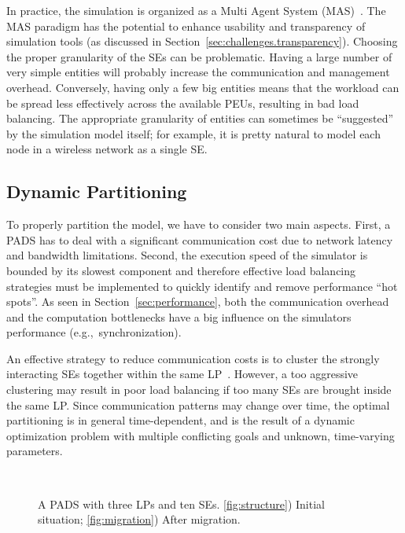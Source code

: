 \documentclass[1p]{elsarticle}
\begin{document}
In practice, the simulation is organized as a Multi Agent System
(MAS)~\cite{Wooldridge:2009:IMS:1695886}. The MAS paradigm has the
potential to enhance usability and transparency of simulation tools
(as discussed in Section~\ref{sec:challenges.transparency}). Choosing
the proper granularity of the SEs can be problematic. Having a large
number of very simple entities will probably increase the
communication and management overhead. Conversely, having only a few
big entities means that the workload can be spread less effectively
across the available PEUs, resulting in bad load balancing. The
appropriate granularity of entities can sometimes be ``suggested'' by
the simulation model itself; for example, it is pretty natural to
model each node in a wireless network as a single SE.

\subsection{Dynamic Partitioning}

To properly partition the model, we have to consider two main
aspects. First, a PADS has to deal with a significant communication
cost due to network latency and bandwidth limitations. Second, the
execution speed of the simulator is bounded by its slowest component
and therefore effective load balancing strategies must be implemented
to quickly identify and remove performance ``hot spots''. As seen in
Section~\ref{sec:performance}, both the communication overhead and the
computation bottlenecks have a big influence on the simulators 
performance (e.g.,~synchronization).

An effective strategy to reduce communication costs is to cluster the
strongly interacting SEs together within the same
LP~\cite{gda-pads-2003}. However, a too aggressive clustering may
result in poor load balancing if too many SEs are brought inside the
same LP.  Since communication patterns may change over time, the
optimal partitioning is in general time-dependent, and is the result
of a dynamic optimization problem with multiple conflicting goals and
unknown, time-varying parameters.

\begin{figure}[ht]
\centering
{}\\
\caption{A PADS with three LPs and ten SEs. \ref{fig:structure}) Initial situation; \ref{fig:migration}) After migration.}
\end{figure}
\end{document}
